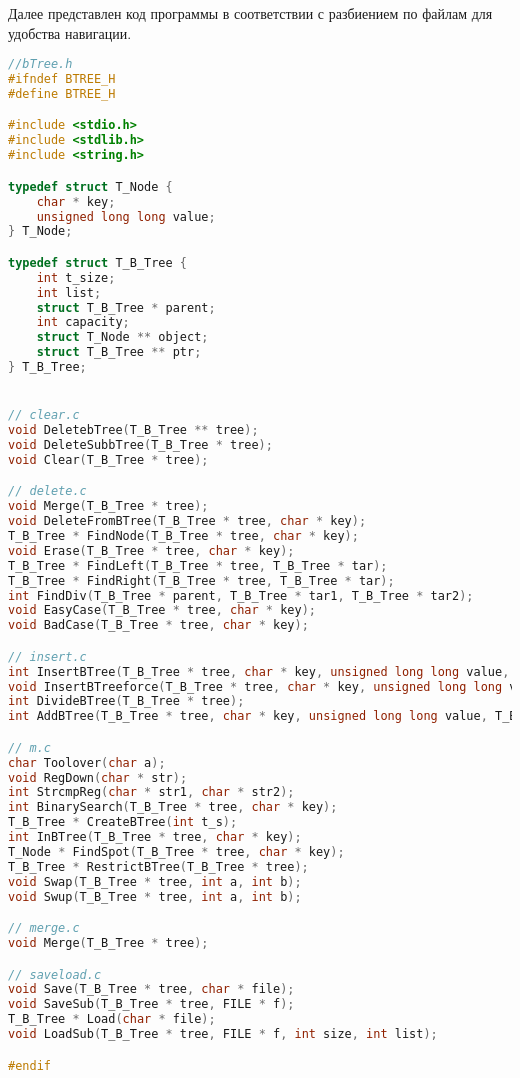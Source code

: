 Далее представлен код программы в соответствии с разбиением по файлам для удобства навигации.

\begin{lstlisting}[language=C]
//bTree.h
#ifndef BTREE_H
#define BTREE_H

#include <stdio.h>
#include <stdlib.h>
#include <string.h>

typedef struct T_Node {
    char * key;
    unsigned long long value;
} T_Node;

typedef struct T_B_Tree {
    int t_size;
    int list;
    struct T_B_Tree * parent;
    int capacity;
    struct T_Node ** object;
    struct T_B_Tree ** ptr;
} T_B_Tree;


// clear.c
void DeletebTree(T_B_Tree ** tree);
void DeleteSubbTree(T_B_Tree * tree);
void Clear(T_B_Tree * tree);

// delete.c
void Merge(T_B_Tree * tree);
void DeleteFromBTree(T_B_Tree * tree, char * key);
T_B_Tree * FindNode(T_B_Tree * tree, char * key);
void Erase(T_B_Tree * tree, char * key);
T_B_Tree * FindLeft(T_B_Tree * tree, T_B_Tree * tar);
T_B_Tree * FindRight(T_B_Tree * tree, T_B_Tree * tar);
int FindDiv(T_B_Tree * parent, T_B_Tree * tar1, T_B_Tree * tar2);
void EasyCase(T_B_Tree * tree, char * key);
void BadCase(T_B_Tree * tree, char * key);

// insert.c
int InsertBTree(T_B_Tree * tree, char * key, unsigned long long value, T_B_Tree * left, T_B_Tree * right);
void InsertBTreeforce(T_B_Tree * tree, char * key, unsigned long long value, T_B_Tree * left, T_B_Tree * right);
int DivideBTree(T_B_Tree * tree);
int AddBTree(T_B_Tree * tree, char * key, unsigned long long value, T_B_Tree * left, T_B_Tree * right);

// m.c
char Toolover(char a);
void RegDown(char * str);
int StrcmpReg(char * str1, char * str2);
int BinarySearch(T_B_Tree * tree, char * key);
T_B_Tree * CreateBTree(int t_s);
int InBTree(T_B_Tree * tree, char * key);
T_Node * FindSpot(T_B_Tree * tree, char * key);
T_B_Tree * RestrictBTree(T_B_Tree * tree);
void Swap(T_B_Tree * tree, int a, int b);
void Swup(T_B_Tree * tree, int a, int b);

// merge.c
void Merge(T_B_Tree * tree);

// saveload.c
void Save(T_B_Tree * tree, char * file);
void SaveSub(T_B_Tree * tree, FILE * f);
T_B_Tree * Load(char * file);
void LoadSub(T_B_Tree * tree, FILE * f, int size, int list);

#endif
\end{lstlisting}


